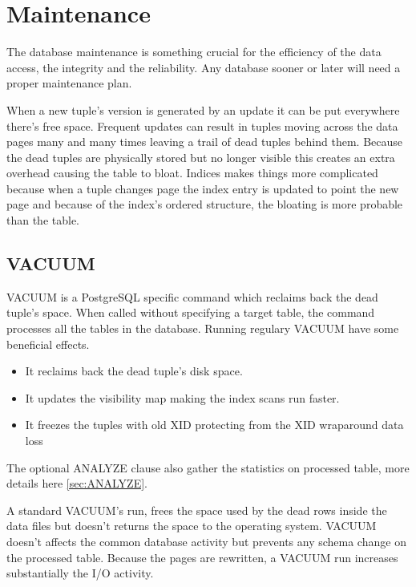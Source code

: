 \chapter{Maintenance}
\label{cha:MAINTENANCE}
The database maintenance is something crucial for the efficiency of the data access, the integrity 
and the reliability. Any database sooner or later will need a proper maintenance plan. \newline

When a new tuple's version is generated by an update it can be put everywhere there's free space. 
Frequent updates can result in tuples moving across the data pages many and many times leaving a 
trail of dead tuples behind them. Because the dead tuples are physically stored but no 
longer visible this creates an extra overhead causing the table to bloat.
Indices makes things more complicated because when a tuple changes page the index entry is updated 
to point the new page and because of the index's ordered structure, the bloating is more 
probable than the table. 


\section{VACUUM}
\label{sec:VACUUM}
VACUUM is a PostgreSQL specific command which reclaims back the dead tuple's space. When called 
without specifying a target table, the command processes all the tables in the database. Running 
regulary VACUUM have some beneficial effects.

\begin{itemize}
 \item It reclaims back the dead tuple's disk space.
 \item It updates the visibility map making the index scans run faster.
 \item It freezes the tuples with old XID protecting from the XID wraparound 
data loss
\end{itemize}

The optional ANALYZE clause also gather the statistics on processed table, more details here 
\ref{sec:ANALYZE}.\newline

A standard VACUUM's run, frees the space used by the dead rows inside the data files but doesn't 
returns the space to the operating system. VACUUM doesn't affects the common database activity 
but prevents any schema change on the processed table. Because the pages are rewritten, a VACUUM 
run increases substantially the I/O activity. \newline

